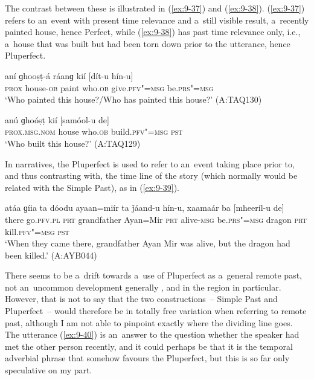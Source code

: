 The contrast between these is illustrated in (\ref{ex:9-37}) and (\ref{ex:9-38}). (\ref{ex:9-37}) refers to an~event with present time relevance and a~still visible result, a~recently painted house, hence Perfect, while (\ref{ex:9-38}) has past time relevance only, i.e., a~house that was built but had been torn down prior to the utterance, hence Pluperfect.

\begin{exe}
\ex
\label{ex:9-37}
\gll aní ɡhooṣṭ-á ráanɡ kií [dít-u hín-u]  \\
\textsc{prox} house-\textsc{ob} paint who.\textsc{ob} give.\textsc{pfv"=msg} be.\textsc{prs"=msg} \\
\glt `Who painted this house?/Who has painted this house?' (A:TAQ130)

\ex
\label{ex:9-38}
\gll anú ɡhoóṣṭ kií [samóol-u de] \\
\textsc{prox.msg.nom} house who.\textsc{ob} build.\textsc{pfv"=msg} \textsc{pst} \\
\glt `Who built this house?' (A:TAQ129)
\end{exe}

In narratives, the Pluperfect is used to refer to an~event taking place prior to, and thus contrasting with, the time line of the story (which normally would be related with the Simple Past), as in (\ref{ex:9-39}).

\begin{exe}
\ex
\label{ex:9-39}
\gll atáa ɡíia ta dóodu ayaan=miír ta ǰáand-u hín-u, xaamaár ba [mheeríl-u de] \\
there go.\textsc{pfv.pl} \textsc{prt} grandfather Ayan=Mir \textsc{prt}  alive-\textsc{msg}
be.\textsc{prs"=msg} dragon \textsc{prt} kill.\textsc{pfv"=msg} \textsc{pst} \\
\glt `When they came there, grandfather Ayan Mir was alive, but the dragon had been killed.' (A:AYB044) 
\end{exe}

There seems to be a~drift towards a~use of Pluperfect as a~general remote past, not an~uncommon development generally \citep[147]{dahl1985}, and in the region in particular. However, that is not to say that the two constructions~-- Simple Past and Pluperfect~-- would therefore be in totally free variation when referring to remote past, although I am not able to pinpoint exactly where the dividing line goes. The utterance (\ref{ex:9-40}) is an~answer to the question whether the speaker had met the other person recently, and it could perhaps be that it is the temporal adverbial phrase that somehow favours the Pluperfect, but this is so far only speculative on my part.

